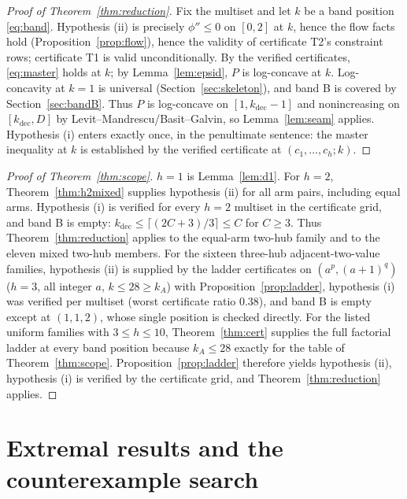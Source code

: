 \documentclass[11pt]{article}
\theoremstyle{definition}
\begin{document}
\begin{proof}[Proof of Theorem~\ref{thm:reduction}]
Fix the multiset and let $k$ be a band position \eqref{eq:band}.
Hypothesis (ii) is precisely $\phi''\le0$ on $[0,2]$ at $k$, hence
the flow facts hold (Proposition~\ref{prop:flow}), hence the validity
of certificate T2's
constraint rows; certificate T1 is valid unconditionally.  By the
verified certificates, \eqref{eq:master} holds at $k$; by
Lemma~\ref{lem:epsid}, $P$ is log-concave at $k$.  Log-concavity at
$k=1$ is universal (Section~\ref{sec:skeleton}), and band B is covered
by Section~\ref{sec:bandB}.  Thus $P$ is log-concave on
$[1,k_{\mathrm{dec}}-1]$ and nonincreasing on $[k_{\mathrm{dec}},D]$
by Levit--Mandrescu/Basit--Galvin, so Lemma~\ref{lem:seam} applies.
Hypothesis (i) enters exactly once, in the penultimate sentence: the
master inequality at $k$ is established by the verified certificate at
$(c_1,\dots,c_h;k)$.
\end{proof}

\begin{proof}[Proof of Theorem~\ref{thm:scope}]
$h=1$ is Lemma~\ref{lem:d1}.
For $h=2$, Theorem~\ref{thm:h2mixed} supplies hypothesis (ii) for
all arm pairs, including equal arms.  Hypothesis (i) is verified for
every $h=2$ multiset in the certificate grid, and band B is empty:
$k_{\mathrm{dec}}\le\lceil(2C+3)/3\rceil\le C$ for $C\ge3$.  Thus
Theorem~\ref{thm:reduction} applies to the equal-arm two-hub family
and to the eleven mixed two-hub members.  For the sixteen three-hub
adjacent-two-value families, hypothesis (ii) is supplied by the
ladder certificates on $(a^p,(a{+}1)^q)$
($h=3$, all integer $a$, $k\le28\ge k_A$) with
Proposition~\ref{prop:ladder}, hypothesis (i) was verified per
multiset (worst certificate ratio $0.38$), and band B is empty
except at $(1,1,2)$, whose single position is checked directly.  For
the listed uniform families with $3\le h\le10$,
Theorem~\ref{thm:cert} supplies the full factorial ladder at every
band position because $k_A\le28$ exactly for the table of
Theorem~\ref{thm:scope}.  Proposition~\ref{prop:ladder} therefore
yields hypothesis (ii), hypothesis (i) is verified by the certificate
grid, and Theorem~\ref{thm:reduction} applies.
\end{proof}

\section{Extremal results and the counterexample
search}\label{sec:extremal}
\end{document}
